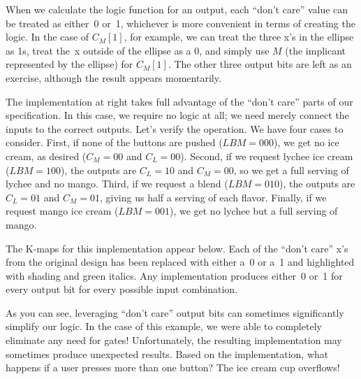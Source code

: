 When we calculate the logic function for an output, each ``don't care''
value can be treated as either~0 or~1, whichever is more convenient
in terms of creating the logic.  In the case of $C_M[1]$, for 
example, we can treat the three x's in the ellipse as 1s, treat the~x
outside of the ellipse as a 0, and simply
use $M$ (the implicant represented by the ellipse) for $C_M[1]$.  The
other three output bits are left as an exercise, although the result 
appears momentarily.

\begin{minipage}{4.2in}
The implementation at right takes full advantage of the ``don't care''
parts of our specification.  In this case, we require no logic at all;
we need merely connect the inputs to the correct outputs.  Let's verify
the operation.  We have four cases to consider.  First, if none of the 
buttons are pushed ($LBM=000$), we get no ice cream, as desired ($C_M=00$ 
and $C_L=00$).  Second, if we request lychee ice cream ($LBM=100$), the
outputs are $C_L=10$ and $C_M=00$, so we get a full serving of lychee
and no mango.  Third, if we request a blend ($LBM=010$), the outputs
are $C_L=01$ and $C_M=01$, giving us half a serving of each flavor.
Finally, if we request mango ice cream ($LBM=001$), we get no lychee
but a full serving of mango.
\end{minipage}\hspace{.25in}%
\begin{minipage}{1.35in}
\end{minipage}

The K-maps for this implementation appear below.  Each of
the ``don't care'' x's from the original design has been replaced with
either a~0 or a~1 and highlighted with shading and green italics.
Any implementation produces 
either~0 or~1 for every output bit for every possible input combination.\\

\centerline{\hspace{.25in}\hspace{.25in}\hspace{.25in}}

As you can see, leveraging ``don't care'' output bits can sometimes
significantly simplify our logic.  In the case of this example, we were
able to completely eliminate any need for gates!  Unfortunately, 
the resulting implementation may sometimes produce unexpected results. 
%
Based on the implementation, what happens if a user presses more
than one button?  The ice cream cup overflows!

